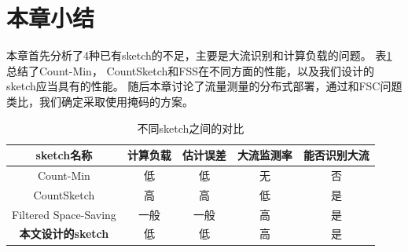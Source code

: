 
\section{本章小结}


本章首先分析了4种已有sketch的不足，主要是大流识别和计算负载的问题。
表\ref{tbl:sketchcompare}总结了Count-Min， CountSketch和FSS在不同方面的性能，以及我们设计的sketch应当具有的性能。
随后本章讨论了流量测量的分布式部署，通过和FSC问题类比，我们确定采取使用掩码的方案。


\begin{table}[ht]
	\centering
	\caption{不同sketch之间的对比}\label{tbl:sketchcompare}
	\begin{tabular}{c|c|c|c|c}
		\hline
		sketch名称 & 计算负载 &估计误差&大流监测率& 能否识别大流 \\
		\hline
		Count-Min\cite{cormode2004improved} & 低 &低& 无 &否\\
		\hline
		CountSketch\cite{charikar2004finding} & 高 &高 &低&是\\
		\hline
		Filtered Space-Saving\cite{homem2010finding}  & 一般 & 一般&高& 是\\
		\hline
		\textbf{本文设计的sketch} & 低 &低 &高&是\\
		\hline		
	\end{tabular}
\end{table}